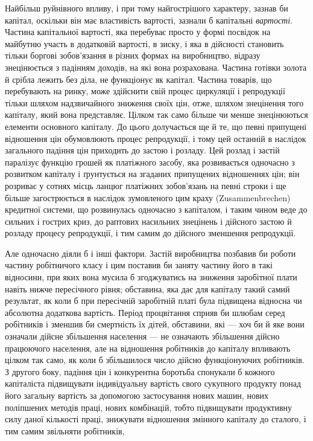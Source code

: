 
Найбільш руйнівного впливу, і при тому найгострішого
характеру, зазнав би капітал, оскільки він має властивість
вартості, зазнали б капітальні \emph{вартості}. Частина капітальної
вартості, яка перебуває просто у формі посвідок на майбутню
участь в додатковій вартості, в зиску, і яка в дійсності становить
тільки боргові зобов’язання в різних формах на виробництво,
відразу знецінюється з падінням доходів, на які вона розрахована.
Частина готівки золота й срібла лежить без діла, не функціонує
як капітал. Частина товарів, що перебувають на ринку, може
здійснити свій процес циркуляції і репродукції тільки шляхом
надзвичайного зниження своїх цін, отже, шляхом знецінення
того капіталу, який вона представляє. Цілком так само більше
чи менше знецінюються елементи основного капіталу. До цього
долучається ще й те, що певні припущені відношення цін
обумовлюють процес репродукції, і тому цей останній в наслідок
загального падіння цін приходить до застою і розладу. Цей
розлад і застій паралізує функцію грошей як платіжного засобу,
яка розвивається одночасно з розвитком капіталу і ґрунтується
на згаданих припущених відношеннях цін; він розриває у сотнях
місць ланцюг платіжних зобов’язань на певні строки і ще більше
загострюється в наслідок зумовленого цим краху (Zusammenbrechen)
кредитної системи, що розвинулась одночасно з капіталом,
і таким чином веде до сильних і гострих криз, до раптових
насильних знецінень і дійсного застою й розладу
процесу
репродукції, і тим самим до дійсного зменшення репродукції.

Але одночасно діяли б і інші фактори. Застій виробництва
позбавив би роботи частину робітничого класу і цим поставив би
заняту частину його в такі відносини, при яких вона мусила б
згоджуватись на зниження заробітної плати навіть нижче пересічного
рівня; обставина, яка дає для капіталу такий самий результат,
як коли б при пересічній заробітній платі була підвищена
відносна чи абсолютна додаткова вартість. Період процвітання
сприяв би шлюбам серед робітників і зменшив би смертність їх
дітей, обставини, які — хоч би й яке вони означали дійсне збільшення
населення — не означають збільшення дійсно працюючого
населення, але на відношення робітників до капіталу впливають
цілком так само, як коли б збільшилося число дійсно функціонуючих
робітників. З другого боку, падіння цін і конкурентна
боротьба спонукали б кожного капіталіста підвищувати індивідуальну
вартість свого сукупного продукту понад його загальну
вартість за допомогою застосування нових машин, нових поліпшених
методів праці, нових комбінацій, тобто підвищувати продуктивну
силу даної кількості праці, знижувати відношення
змінного капіталу до сталого, і тим самим звільняти робітників,
\parbreak{}  %
